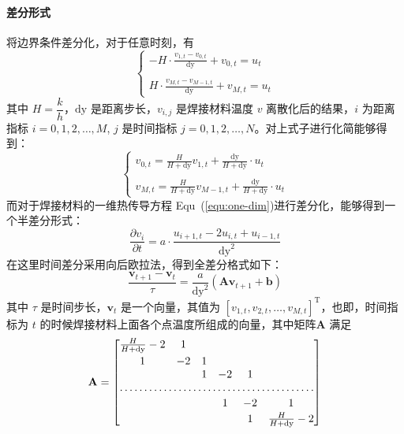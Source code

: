 \documentclass[../main.tex]{subfiles}
\begin{document}
\paragraph{差分形式}
将边界条件差分化，对于任意时刻，有
\begin{equation}
\begin{cases}
\displaystyle - H \cdot \frac{v _{1, t}  - v _{0, t}}{\mathrm{dy}} + v_{0 ,t} = u_{t} \\
\\
\displaystyle H \cdot\frac{v_{M , t} - v _{M-1, t}}{\mathrm{dy}} + v_{M,t} = u_{t}
\end{cases}
\end{equation}
其中 \(H = \dfrac{k}{h}\)，\(\mathrm{dy}\) 是距离步长，\(v_{i,j}\) 是焊接材料温度 \(v\) 离散化后的结果，\(i\) 为距离指标 \(i = 0,  1,  2 , \dots , M\), \(j\) 是时间指标 \(j = 0 , 1 , 2 , \dots, N\)。对上式子进行化简能够得到：
\begin{equation}
\begin{cases}
\displaystyle v_{0,t} = \frac{H}{H + \mathrm{dy}} v_{1 ,t} + \frac{\mathrm{dy}}{H + \mathrm{dy}} \cdot u_{t}\\
\\
\displaystyle v_{M,t} = \frac{H}{H + \mathrm{dy}} v _{M-1, t} + \frac{\mathrm{dy}}{H + \mathrm{dy}} \cdot u_{t}
\end{cases}
\end{equation}
而对于焊接材料的一维热传导方程 Equ~(\ref{equ:one-dim})进行差分化，能够得到一个半差分形式：
\begin{equation}
\frac{\partial v _{i}}{\partial t} = a \cdot \frac{u_{i+1, t} - 2 u_{i, t} + u_{i- 1 , t}}{\mathrm{dy} ^{2}}
\end{equation}
在这里时间差分采用向后欧拉法，得到全差分格式如下：
\begin{equation}\label{equ:all}
\frac{\mathbf{v}_{t+1}  - \mathbf{v}_{t}}{\tau}= \frac{a}{\mathrm{dy}^{2}} (\mathbf{A}\mathbf{v} _{t+1} + \mathbf{b})
\end{equation}
其中 \(\tau\) 是时间步长，\(\mathbf{v}_{t}\) 是一个向量，其值为 \([v _{1, t}, v_{2, t}, \dots, v_{M, t}]^{\mathrm{T}}\)，也即，时间指标为 \(t\) 的时候焊接材料上面各个点温度所组成的向量，其中矩阵\(\mathbf A\) 满足
\begin{equation}
\mathbf{A} = 
\begin{bmatrix}
\frac{H}{H + \mathrm{dy}} - 2 & 1 &&\\
\\[-10pt]
1 & -2 & 1 &\\
& & 1 & -2 & 1 \\
\hdotsfor{6}\\
\\[-10pt]
&& & 1 & -2 & 1 \\
\\[-10pt]
&& &  & 1 &\frac{H}{H + \mathrm{dy}} -2 
\end{bmatrix}
\end{equation}
\end{document}
